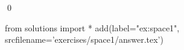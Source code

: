 
\begin{ex} 
  \label{ex:space1}
  
  \qed
\end{ex} 
\begin{python0}
from solutions import *
add(label="ex:space1",
    srcfilename='exercises/space1/answer.tex') 
\end{python0}
